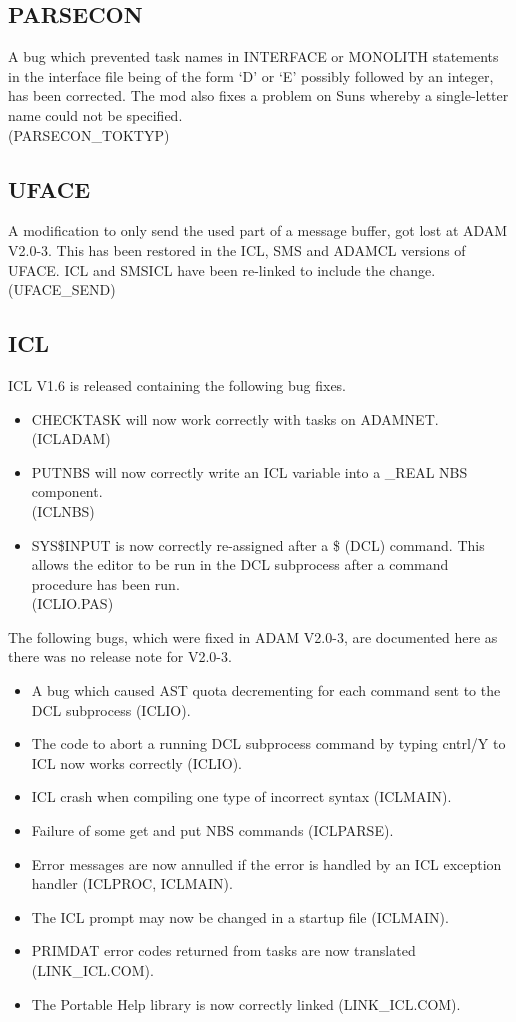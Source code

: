 \subsection{PARSECON}
A bug which prevented task names in INTERFACE or MONOLITH statements in the
interface file being of the form `D' or `E' possibly followed by
an integer, has been corrected. The mod also fixes a problem on Suns whereby a 
single-letter name could not be specified.\\
(PARSECON\_TOKTYP)

\subsection{UFACE}
A modification to only send the used part of a message buffer, got lost at
ADAM V2.0-3. This has been restored in the ICL, SMS and ADAMCL versions of
UFACE. 
ICL and SMSICL have been re-linked to include the change.\\(UFACE\_SEND)

\subsection{ICL}
ICL V1.6 is released containing the following bug fixes.
\begin{itemize}
\item CHECKTASK will now work correctly with tasks on ADAMNET.\\
(ICLADAM)
\item PUTNBS will now correctly write an ICL variable into a \_REAL NBS
component.\\
(ICLNBS)
\item SYS\$INPUT is now correctly re-assigned after a \$ (DCL) command.
This allows the editor to be run in the DCL subprocess after a
command procedure has been run.\\
(ICLIO.PAS)
\end{itemize}
The following bugs, which were fixed in ADAM V2.0-3, are documented here as
there was no release note for V2.0-3.
\begin{itemize}
\item A bug which caused AST quota decrementing for each command sent to
the DCL subprocess (ICLIO).
\item The code to abort a running DCL subprocess command by typing cntrl/Y
to ICL now works correctly (ICLIO).
\item ICL crash when compiling one type of incorrect syntax (ICLMAIN).
\item Failure of some get and put NBS commands (ICLPARSE).
\item Error messages are now annulled if the error is handled by an ICL
exception handler (ICLPROC, ICLMAIN).
\item The ICL prompt may now be changed in a startup file (ICLMAIN).
\item PRIMDAT error codes returned from tasks are now translated 
(LINK\_ICL.COM).
\item The Portable Help library is now correctly linked (LINK\_ICL.COM).
\end{itemize}

